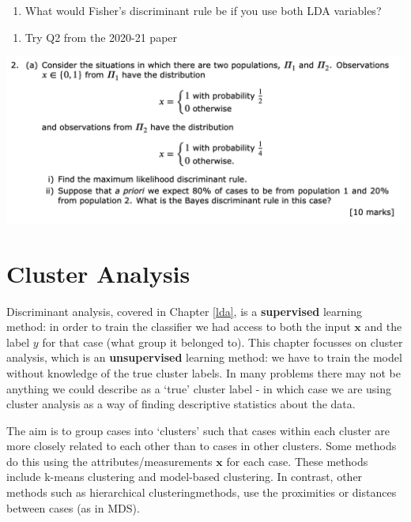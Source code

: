 \documentclass[
]{book}
\providecommand{\tightlist}{%
  \setlength{\itemsep}{0pt}\setlength{\parskip}{0pt}}
\theoremstyle{definition}
\theoremstyle{definition}
\theoremstyle{definition}
\theoremstyle{definition}
\theoremstyle{remark}
\begin{document}
\begin{enumerate}
\def\labelenumi{\roman{enumi}.}
\setcounter{enumi}{3}
\tightlist
\item
  What would Fisher's discriminant rule be if you use both LDA variables?
\end{enumerate}

\begin{enumerate}
\def\labelenumi{\arabic{enumi}.}
\setcounter{enumi}{5}
\tightlist
\item
  Try Q2 from the 2020-21 paper
\end{enumerate}

\includegraphics{figs/LDA_2020_21_Q2.png}

\chapter{Cluster Analysis}\label{cluster}

Discriminant analysis, covered in Chapter \ref{lda}, is a \textbf{supervised} learning method: in order to train the classifier we had access to both the input \(\mathbf x\) and the label \(y\) for that case (what group it belonged to).
This chapter focusses on cluster analysis, which is an \textbf{unsupervised} learning method: we have to train the model without knowledge of the true cluster labels. In many problems there may not be anything we could describe as a `true' cluster label - in which case we are using cluster analysis as a way of finding descriptive statistics about the data.

The aim is to group cases into `clusters' such that cases within each cluster are more closely related to each other than to cases in other clusters. Some methods do this using the attributes/measurements \(\mathbf x\) for each case. These methods include k-means clustering and model-based clustering. In contrast, other methods such as hierarchical clusteringmethods, use the proximities or distances between cases (as in MDS).
\end{document}
